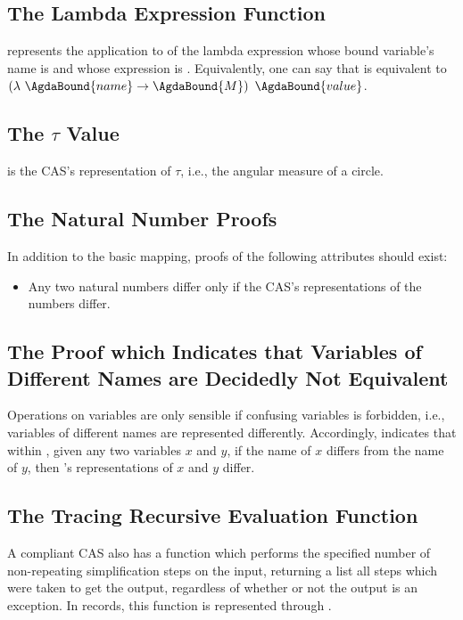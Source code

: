 \documentclass{report}
\begin{document}
\subsection{The Lambda Expression Function}
     represents the application to  of the lambda expression whose bound variable's name is  and whose expression is .  Equivalently, one can say that      is equivalent to \(\left(\lambda\ \AgdaBound{name} \rightarrow \AgdaBound{M}\right)\ \AgdaBound{value}\).

\subsection{The \(\tau\) Value}
  is the  CAS's representation of \(\tau\), i.e., the angular measure of a circle.

\subsection{The Natural Number Proofs}
In addition to the basic mapping, proofs of the following attributes should exist:

\begin{itemize}
  \item Any two natural numbers differ only if the CAS's representations of the numbers differ.
\end{itemize}

\subsection{The Proof which Indicates that Variables of Different Names are Decidedly Not Equivalent}
Operations on variables are only sensible if confusing variables is forbidden, i.e., variables of different names are represented differently.  Accordingly,   indicates that within , given any two variables \(x\) and \(y\), if the name of \(x\) differs from the name of \(y\), then 's representations of \(x\) and \(y\) differ.

\subsection{The Tracing Recursive Evaluation Function}
A compliant CAS also has a function which performs the specified number of non-repeating simplification steps on the input, returning a list all steps which were taken to get the output, regardless of whether or not the output is an exception.  In  records, this function is represented through .
\end{document}
